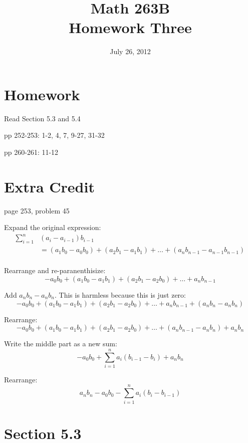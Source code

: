 \documentclass{exam}
\title{Math 263B \\ Homework Three}
\date{July 26, 2012}
\begin{document}
\maketitle

\section{Homework}

\begin{itemize*}
  \item Read Section 5.3 and 5.4
  \item pp 252-253: 1-2, 4, 7, 9-27, 31-32
  \item pp 260-261: 11-12
\end{itemize*}

\section{Extra Credit}
page 253, problem 45

\ifprintanswers
\pagebreak
\fi

\begin{solution}

Expand the original expression:
\begin{align*}
  \sum_{i = 1}^n &(a_i - a_{i - 1}) b_{i - 1} \\
  &= (a_1 b_0 - a_0 b_0) + (a_2 b_1 - a_1 b_1) + \ldots + (a_n b_{n-1} - a_{n-1} b_{n - 1}) \\
\end{align*}

Rearrange and re-paranenthisize:
\[
  - a_0 b_0 + ( a_1 b_0 - a_1 b_1 ) + (a_2 b_1 - a_2 b_0) + \ldots + a_n b_{n-1} 
\]

Add $a_nb_n - a_nb_n$. This is harmless because this is just zero:
\[
  - a_0 b_0 + ( a_1 b_0 - a_1 b_1 ) + (a_2 b_1 - a_2 b_0) + \ldots + a_n b_{n-1} + (a_n b_n - a_n b_n)
\]

Rearrange:
\[
  - a_0 b_0 + ( a_1 b_0 - a_1 b_1 ) + (a_2 b_1 - a_2 b_0) + \ldots + (a_n b_{n-1} - a_n b_n) + a_n b_n
\]

Write the middle part as a new sum:
\[
  - a_0 b_0 + \sum_{i = 1}^n a_i (b_{i - 1} - b_{i}) + a_n b_n
\]

Rearrange:
\[
  a_n b_n - a_0 b_0 - \sum_{i = 1}^n a_i (b_i - b_{i - 1})
\]

\end{solution}

\ifprintanswers
\pagebreak

\section{Section 5.3}
\end{document}
